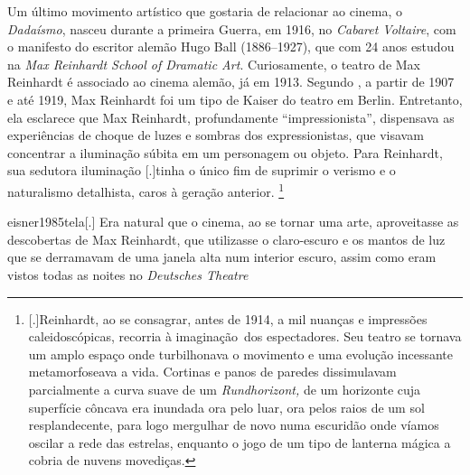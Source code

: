 Um último movimento artístico que gostaria de relacionar ao cinema, o
\emph{Dadaísmo}, nasceu durante a primeira Guerra, em 1916, no
\emph{Cabaret Voltaire}, com o manifesto do escritor alemão Hugo Ball
(1886--1927), que com 24 anos estudou na \emph{Max Reinhardt School of
	Dramatic Art}. Curiosamente, o teatro de Max Reinhardt é associado ao
cinema alemão, já em 1913. Segundo \textcite[44]{eisner1985tela}, a
partir de 1907 e até 1919, Max Reinhardt foi um tipo de Kaiser do
teatro em Berlin. Entretanto, ela esclarece que Max Reinhardt,
profundamente \enquote{impressionista}, dispensava as experiências de
choque de luzes e sombras dos expressionistas, que visavam concentrar a
iluminação súbita em um personagem ou objeto. Para Reinhardt, sua
sedutora iluminação [.]{tinha o único
	fim de suprimir o verismo e o naturalismo detalhista, caros à geração
	anterior}. \footnote{[.]{Reinhardt, ao se consagrar, antes de
		1914, a mil nuanças e impressões caleidoscópicas, recorria à imaginação~dos
    espectadores. Seu teatro se tornava um amplo espaço onde
		turbilhonava o movimento e uma evolução incessante metamorfoseava a
		vida. Cortinas e panos de paredes dissimulavam parcialmente a curva
		suave de um \emph{Rundhorizont,} de um horizonte cuja superfície
		côncava era inundada ora pelo luar, ora pelos raios de um sol
		resplandecente, para logo mergulhar de novo numa escuridão onde víamos
		oscilar a rede das estrelas, enquanto o jogo de um tipo de lanterna
		mágica a cobria de nuvens movediças}.}

\begin{displaycquote}[44]{eisner1985tela}[.]
	Era natural que o cinema, ao se tornar uma arte, aproveitasse as
	descobertas de Max Reinhardt, que utilizasse o claro-escuro e os mantos
	de luz que se derramavam de uma janela alta num interior escuro, assim
	como eram vistos todas as noites no \emph{Deutsches Theatre}
\end{displaycquote}


